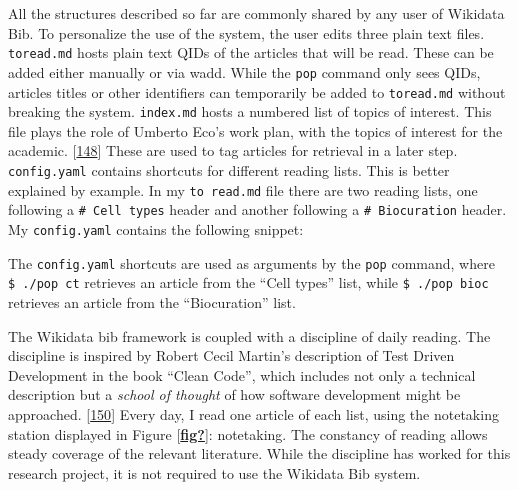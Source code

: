 All the structures described so far are commonly shared by any user of Wikidata Bib.
To personalize the use of the system, the user edits three plain text files.
\texttt{toread.md} hosts plain text QIDs of the articles that will be read.
These can be added either manually or via wadd.
While the \texttt{pop} command only sees QIDs, articles titles or other identifiers can temporarily be added to \texttt{toread.md} without breaking the system.
\texttt{index.md} hosts a numbered list of topics of interest.
This file plays the role of Umberto Eco's work plan, with the topics of interest for the academic. {[}\protect\hyperlink{ref-1HBVPtZGp}{148}{]}
These are used to tag articles for retrieval in a later step.
\texttt{config.yaml} contains shortcuts for different reading lists.
This is better explained by example.
In my \texttt{to\ read.md} file there are two reading lists, one following a \texttt{\#\ Cell\ types} header and another following a \texttt{\#\ Biocuration} header.
My \texttt{config.yaml} contains the following snippet:

\begin{Shaded}
\begin{Highlighting}[]
\KeywordTok{:}
\AttributeTok{  }\KeywordTok{:}
\AttributeTok{  }\KeywordTok{:}
\end{Highlighting}
\end{Shaded}

The \texttt{config.yaml} shortcuts are used as arguments by the \texttt{pop} command, where \texttt{\$\ ./pop\ ct} retrieves an article from the ``Cell types'' list, while \texttt{\$\ ./pop\ bioc} retrieves an article from the ``Biocuration'' list.

The Wikidata bib framework is coupled with a discipline of daily reading.
The discipline is inspired by Robert Cecil Martin's description of Test Driven Development in the book ``Clean Code'', which includes not only a technical description but a \emph{school of thought} of how software development might be approached. {[}\protect\hyperlink{ref-13HqB23xH}{150}{]}
Every day, I read one article of each list, using the notetaking station displayed in Figure {[}\protect\hyperlink{ref-fig}{\textbf{fig?}}{]}: notetaking.
The constancy of reading allows steady coverage of the relevant literature.
While the discipline has worked for this research project, it is not required to use the Wikidata Bib system.

